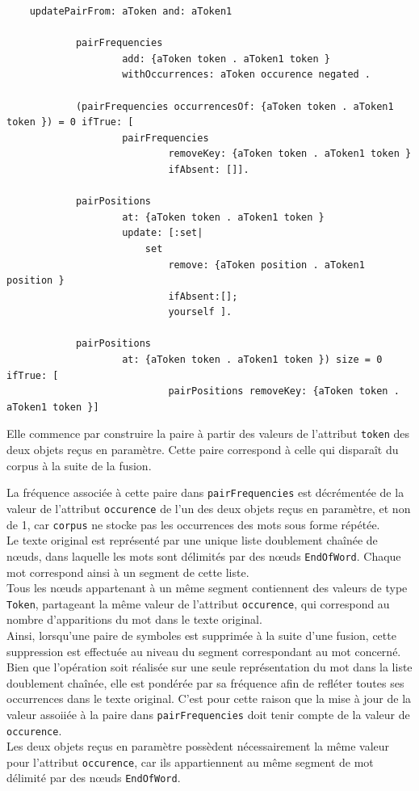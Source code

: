 \documentclass[12pt,a4paper]{report}
\begin{document}
	\begin{verbatim}
	updatePairFrom: aToken and: aToken1
	
			pairFrequencies 
					add: {aToken token . aToken1 token } 
					withOccurrences: aToken occurence negated .
					
			(pairFrequencies occurrencesOf: {aToken token . aToken1 token }) = 0 ifTrue: [
					pairFrequencies
							removeKey: {aToken token . aToken1 token }
							ifAbsent: []].
							
			pairPositions
					at: {aToken token . aToken1 token }
					update: [:set|
						set
							remove: {aToken position . aToken1 position }
							ifAbsent:[];
							yourself ].
							
			pairPositions
					at: {aToken token . aToken1 token }) size = 0 ifTrue: [
							pairPositions removeKey: {aToken token . aToken1 token }]
	\end{verbatim}
	
	Elle commence par construire la paire à partir des valeurs de l’attribut \texttt{token} des deux objets reçus en paramètre. Cette paire correspond à celle qui disparaît du corpus à la suite de la fusion.
	
	La fréquence associée à cette paire dans \texttt{pairFrequencies} est décrémentée de la valeur de l’attribut \texttt{occurence} de l’un des deux objets reçus en paramètre, et non de 1, car \texttt{corpus} ne stocke pas les occurrences des mots sous forme répétée.\\
	Le texte original est représenté par une unique liste doublement chaînée de nœuds, dans laquelle les mots sont délimités par des nœuds \texttt{EndOfWord}. Chaque mot correspond ainsi à un segment de cette liste.\\
	Tous les nœuds appartenant à un même segment contiennent des valeurs de type \texttt{Token}, partageant la même valeur de l’attribut \texttt{occurence}, qui correspond au nombre d’apparitions du mot dans le texte original.\\
	Ainsi, lorsqu’une paire de symboles est supprimée à la suite d’une fusion, cette suppression est effectuée au niveau du segment correspondant au mot concerné. Bien que l’opération soit réalisée sur une seule représentation du mot dans la liste doublement chaînée, elle est pondérée par sa fréquence afin de refléter toutes ses occurrences dans le texte original. C’est pour cette raison que la mise à jour de la valeur assoiiée à la paire dans \texttt{pairFrequencies} doit tenir compte de la valeur de \texttt{occurence}.\\
	Les deux objets reçus en paramètre possèdent nécessairement la même valeur pour l'attribut \texttt{occurence}, car ils appartiennent au même segment de mot délimité par des nœuds \texttt{EndOfWord}.
	
\end{document}

